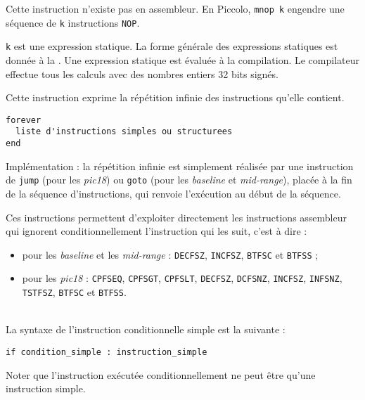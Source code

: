 
Cette instruction n'existe pas en assembleur. En Piccolo, \texttt{mnop k} engendre une séquence de \texttt{k} instructions \texttt{NOP}.

\texttt{k} est une expression statique. La forme générale des expressions statiques est donnée à la . Une expression statique est évaluée à la compilation. Le compilateur effectue tous les calculs avec des nombres entiers 32 bits signés.



Cette instruction exprime la répétition infinie des instructions qu'elle contient.
\begin{lstlisting}[language=piccolo]
forever
  liste d'instructions simples ou structurees
end
\end{lstlisting}

Implémentation : la répétition infinie est simplement réalisée par une instruction de \texttt{jump} (pour les \emph{pic18}) ou \texttt{goto} (pour les \emph{baseline} et \emph{mid-range}), placée à la fin de la séquence d'instructions, qui renvoie l'exécution au début de la séquence.




Ces instructions permettent d'exploiter directement les instructions assembleur qui ignorent conditionnellement l'instruction qui les suit, c'est à dire :
\begin{itemize}
\item pour les \emph{baseline} et les \emph{mid-range} : \texttt{DECFSZ}, \texttt{INCFSZ}, \texttt{BTFSC} et \texttt{BTFSS} ;
\item pour les \emph{pic18} : \texttt{CPFSEQ}, \texttt{CPFSGT}, \texttt{CPFSLT}, \texttt{DECFSZ}, \texttt{DCFSNZ}, \texttt{INCFSZ}, \texttt{INFSNZ}, \texttt{TSTFSZ}, \texttt{BTFSC} et \texttt{BTFSS}.
\end{itemize}

~\\
La syntaxe de l'instruction conditionnelle simple est la suivante :

\begin{lstlisting}[language=piccolo]
if condition_simple : instruction_simple
\end{lstlisting}

Noter que l'instruction exécutée conditionnellement ne peut être qu'une instruction simple.

